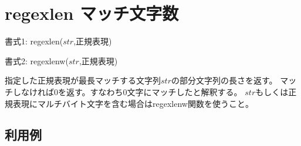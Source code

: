 
%

\section{regexlen マッチ文字数\label{sect:regexlen}}

書式1: regexlen($str$,正規表現)

書式2: regexlenw($str$,正規表現)

指定した正規表現が最長マッチする文字列$str$の部分文字列の長さを返す。
マッチしなければ0を返す。すなわち0文字にマッチしたと解釈する。
$str$もしくは正規表現にマルチバイト文字を含む場合はregexlenw関数を使うこと。

\subsection*{利用例}


%


